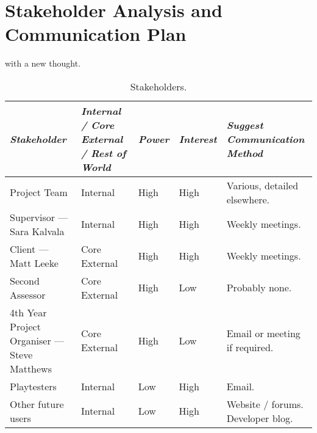 \chapter[Stakeholder Analysis and Communication Plan]{Stakeholder Analysis and Communication Plan}
\label{ch:communication}

 with a new thought.

\begin{table*}
	\small
	\renewcommand{\arraystretch}{1.2}
	\begin{tabular}{p{20em} p{7em} p{3em} p{3em} p{13em}}
		\toprule
		\emph{Stakeholder} & \emph{Internal / Core External / Rest of World} & \emph{Power} & \emph{Interest} & \emph{Suggest Communication Method} \\
		\midrule
		
		Project Team & Internal & High & High & Various, detailed elsewhere. \\
		Supervisor --- Sara Kalvala & Internal & High & High & Weekly meetings. \\
		Client --- Matt Leeke & Core External & High & High & Weekly meetings. \\
		Second Assessor & Core External & High & Low & Probably none. \\
		4th Year Project Organiser --- Steve Matthews & Core External & High & Low & Email or meeting if required. \\
		Playtesters & Internal & Low & High & Email. \\
		Other future users & Internal & Low & High & Website / forums. Developer blog. \\
		\bottomrule
	\end{tabular}
	\vspace{1.5em}
	\caption{Stakeholders.}
	\label{tab:pancras}
\end{table*}
